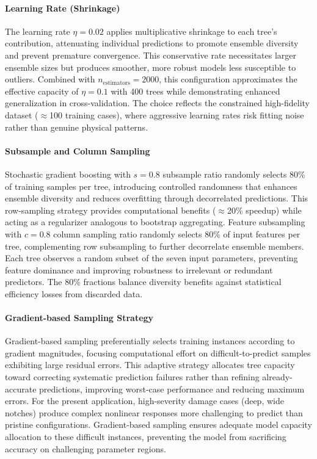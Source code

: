 \documentclass[12pt,a4paper]{report}
\begin{document}
\paragraph{Learning Rate (Shrinkage)} 
The learning rate $\eta = 0.02$ applies multiplicative shrinkage to each tree's contribution, attenuating individual predictions to promote ensemble diversity and prevent premature convergence. This conservative rate necessitates larger ensemble sizes but produces smoother, more robust models less susceptible to outliers. Combined with $n_{\text{estimators}} = 2000$, this configuration approximates the effective capacity of $\eta = 0.1$ with 400 trees while demonstrating enhanced generalization in cross-validation. The choice reflects the constrained high-fidelity dataset ($\approx$100 training cases), where aggressive learning rates risk fitting noise rather than genuine physical patterns.

\paragraph{Subsample and Column Sampling} 
Stochastic gradient boosting with $s = 0.8$ subsample ratio randomly selects 80\% of training samples per tree, introducing controlled randomness that enhances ensemble diversity and reduces overfitting through decorrelated predictions. This row-sampling strategy provides computational benefits ($\approx$20\% speedup) while acting as a regularizer analogous to bootstrap aggregating. Feature subsampling with $c = 0.8$ column sampling ratio randomly selects 80\% of input features per tree, complementing row subsampling to further decorrelate ensemble members. Each tree observes a random subset of the seven input parameters, preventing feature dominance and improving robustness to irrelevant or redundant predictors. The 80\% fractions balance diversity benefits against statistical efficiency losses from discarded data.

\paragraph{Gradient-based Sampling Strategy} 
Gradient-based sampling preferentially selects training instances according to gradient magnitudes, focusing computational effort on difficult-to-predict samples exhibiting large residual errors. This adaptive strategy allocates tree capacity toward correcting systematic prediction failures rather than refining already-accurate predictions, improving worst-case performance and reducing maximum errors. For the present application, high-severity damage cases (deep, wide notches) produce complex nonlinear responses more challenging to predict than pristine configurations. Gradient-based sampling ensures adequate model capacity allocation to these difficult instances, preventing the model from sacrificing accuracy on challenging parameter regions.
\end{document}
